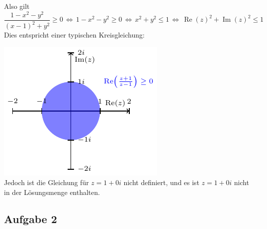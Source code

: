 \documentclass[a4paper,graphics,11pt]{article}
\newcommand{\aufgabe}[1]{\subsection*{Aufgabe #1}}
\newcommand{\re}{\operatorname{Re}}
\newcommand{\im}{\operatorname{Im}}
\begin{document}
Also gilt
$$
    \frac{1-x^2-y^2}{(x-1)^2+y^2} \geq 0
    \,\Longleftrightarrow\, 1-x^2-y^2 \geq 0
    \,\Longleftrightarrow\, x^2+y^2 \leq 1
    \,\Longleftrightarrow\, \re(z)^2+\im(z)^2 \leq 1
$$
Dies entspricht einer typischen Kreisgleichung:\\
\strut\qquad\qquad\qquad\qquad\qquad\qquad\includegraphics[scale=1.5]{graphics/graph0.pdf}\\
Jedoch ist die Gleichung für $z = 1+0i$ nicht definiert, und es ist $z = 1+0i$ nicht in
der Lösungsmenge enthalten.
\newpage
\aufgabe{2}
\end{document}
